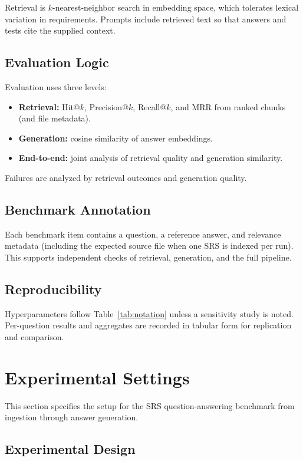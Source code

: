 \documentclass[conference]{IEEEtran}
\begin{document}
Retrieval is $k$-nearest-neighbor search in embedding space, which tolerates lexical variation in requirements. Prompts include retrieved text so that answers and tests cite the supplied context.

\subsection{Evaluation Logic}

Evaluation uses three levels:

\begin{itemize}
    \item \textbf{Retrieval:} Hit@$k$, Precision@$k$, Recall@$k$, and MRR from ranked chunks (and file metadata).
    \item \textbf{Generation:} cosine similarity of answer embeddings.
    \item \textbf{End-to-end:} joint analysis of retrieval quality and generation similarity.
\end{itemize}

Failures are analyzed by retrieval outcomes and generation quality.

\subsection{Benchmark Annotation}

Each benchmark item contains a question, a reference answer, and relevance metadata (including the expected source file when one SRS is indexed per run). This supports independent checks of retrieval, generation, and the full pipeline.

\subsection{Reproducibility}

Hyperparameters follow Table~\ref{tab:notation} unless a sensitivity study is noted. Per-question results and aggregates are recorded in tabular form for replication and comparison.

\section{Experimental Settings}
\label{sec:experiments}

This section specifies the setup for the SRS question-answering benchmark from ingestion through answer generation.

\subsection{Experimental Design}
\end{document}
